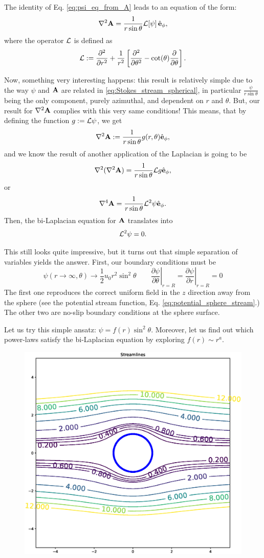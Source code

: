 The identity of Eq. \ref{eq:psi_eq_from_A} leads to an equation of the
form:
\[
  \nabla^2\mathbf{A} = \frac{1}{r \sin\theta} {\cal L}[ \psi] \,  \hat{\mathbf{e}}_\phi ,
\]
where the operator $\cal L$ is defined as
\[
  {\cal L} :=
  \frac{\partial^2  }{\partial r^2} +
  \frac{1}{r^2} \left[
    \frac{\partial^2 }{\partial \theta^2} - 
    \cot(\theta) \frac{\partial }{\partial \theta}
  \right] .
\]

Now, something very interesting happens: this result is relatively
simple due to the way $\psi$ and $\mathbf{A}$ are related in
\ref{eq:Stokes_stream_spherical}, in particular
$\frac{\psi}{r \sin\theta}$ being the only component, purely
azimuthal, and dependent on $r$ and $\theta$.  But, our result for
$\nabla^2\mathbf{A}$ complies with this very same conditions!  This means,
that by defining the function $g:= {\cal L} \psi $, we get
\[
  \nabla^2\mathbf{A} := \frac{1}{r \sin\theta} g(r,\theta) \hat{\mathbf{e}}_\phi ,
\]
and we know the result of another application of the Laplacian is
going to be
\[
  \nabla^2( \nabla^2\mathbf{A}) = \frac{1}{r \sin\theta} {\cal L} g  \hat{\mathbf{e}}_\phi ,
\]
or
\[
  \nabla^4\mathbf{A} = \frac{1}{r \sin\theta} {\cal L}^2 \psi \hat{\mathbf{e}}_\phi .
\]
Then, the bi-Laplacian equation for $\mathbf{A}$ translates into
\[
  {\cal L}^2 \psi = 0.
\]

This still looks quite impressive, but it turns out that simple
separation of variables yields the answer. First, our boundary
conditions must be
\[
  \psi(r \to \infty ,\theta) \to \frac12 u_0 r^2 \sin^2\theta
  \qquad
  \left.\frac{\partial \psi}{\partial \theta}\right|_{r=R} =
  \left.\frac{\partial \psi}{\partial r}\right|_{r=R} = 0
\]
The first one reproduces the correct uniform field in the $z$
direction away from the sphere (see the potential stream function,
Eq. \ref{eq:potential_sphere_stream}.) The other two are no-slip
boundary conditions at the sphere surface.

Let us try this simple ansatz: $\psi=f(r) \sin^2\theta$. Moreover, let
us find out which power-laws satisfy the bi-Laplacian equation by
exploring $f(r) \sim r^a$.


\begin{figure}
  \centering
  \includegraphics[width=0.8\linewidth]{figures/creeping_flow_past_sphere}
  \caption{\label{fig:creeping_flow_past_sphere}}
\end{figure}


